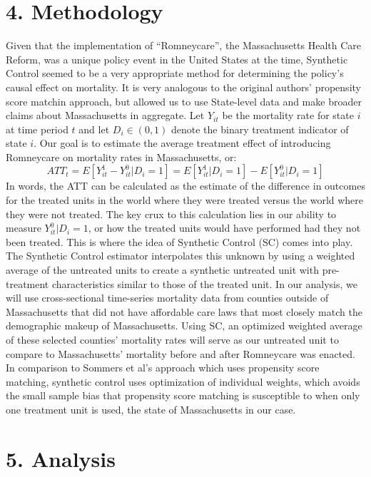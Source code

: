 \documentclass[
]{article}
\begin{document}
\hypertarget{methodology}{%
\section{4. Methodology}\label{methodology}}

Given that the implementation of ``Romneycare'', the Massachusetts
Health Care Reform, was a unique policy event in the United States at
the time, Synthetic Control seemed to be a very appropriate method for
determining the policy's causal effect on mortality. It is very
analogous to the original authors' propensity score matchin approach,
but allowed us to use State-level data and make broader claims about
Massachusetts in aggregate. Let \(Y_{it}\) be the mortality rate for
state \(i\) at time period \(t\) and let \(D_i \in (0,1)\) denote the
binary treatment indicator of state \(i\). Our goal is to estimate the
average treatment effect of introducing Romneycare on mortality rates in
Massachusetts, or:
\[ATT_t = E[Y_{it}^1 - Y_{it}^0 | D_i = 1] = E[Y_{it}^1|D_i = 1] - E[Y_{it}^0|D_i = 1]\]
In words, the ATT can be calculated as the estimate of the difference in
outcomes for the treated units in the world where they were treated
versus the world where they were not treated. The key crux to this
calculation lies in our ability to measure \(Y_{it}^0|D_i=1\), or how
the treated units would have performed had they not been treated. This
is where the idea of Synthetic Control (SC) comes into play. The
Synthetic Control estimator interpolates this unknown by using a
weighted average of the untreated units to create a synthetic untreated
unit with pre-treatment characteristics similar to those of the treated
unit. In our analysis, we will use cross-sectional time-series mortality
data from counties outside of Massachusetts that did not have affordable
care laws that most closely match the demographic makeup of
Massachusetts. Using SC, an optimized weighted average of these selected
counties' mortality rates will serve as our untreated unit to compare to
Massachusetts' mortality before and after Romneycare was enacted. In
comparison to Sommers et al's approach which uses propensity score
matching, synthetic control uses optimization of individual weights,
which avoids the small sample bias that propensity score matching is
susceptible to when only one treatment unit is used, the state of
Massachusetts in our case.

\hypertarget{analysis}{%
\section{5. Analysis}\label{analysis}}
\end{document}

